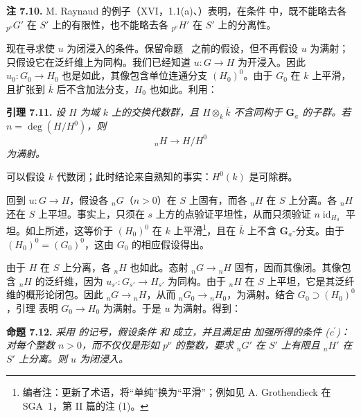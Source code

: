 \medskip
\noindent{}\textbf{注 7.10.}
M. Raynaud 的例子（XVI，1.1(a)、）表明，在条件  中，既不能略去各 \({}_{p^\nu}G'\) 在 \(S'\) 上的有限性，也不能略去各 \({}_{p^\nu}H'\) 在 \(S'\) 上的分离性。

现在寻求使 \(u\) 为闭浸入的条件。保留命题~ 之前的假设，但不再假设 \(u\) 为满射；只假设它在泛纤维上为同构。我们已经知道 \(u:G\to H\) 为开浸入。因此 \(u_0:G_0\to H_0\) 也是如此，其像包含单位连通分支 \((H_0)^0\)。由于 \(G_0\) 在 \(k\) 上平滑，且扩张到 \(\overline{k}\) 后不含加法分支，\(H_0\) 也如此。利用：

\medskip
\noindent{}\textbf{引理 7.11.}
\textit{设 \(H\) 为域 \(k\) 上的交换代数群，且 \(H\otimes_k\overline{k}\) 不含同构于 \(\mathbf G_a\) 的子群。若 \(n=\deg(H/H^0)\)，则}
\[
  {}_nH\longrightarrow H/H^0
\]
\textit{为满射。}

可以假设 \(k\) 代数闭；此时结论来自熟知的事实：\(H^0(k)\) 是可除群。

回到 \(u:G\to H\)，假设各 \({}_nG\)（\(n>0\)）在 \(S\) 上固有，而各 \({}_nH\) 在 \(S\) 上分离。各 \({}_nH\) 还在 \(S\) 上平坦。事实上，只须在 \(s\) 上方的点验证平坦性，从而只须验证 \(n\operatorname{id}_{H_0}\) 平坦。如上所述，这等价于 \((H_0)^0\) 在 \(k\) 上平滑\footnote{编者注：更新了术语，将“单纯”换为“平滑”；例如见 A. Grothendieck 在 SGA~1，第 II 篇的注 (1)。}，且在 \(\overline{k}\) 上不含 \(\mathbf G_a\)-分支。由于 \((H_0)^0=(G_0)^0\)，这由 \(G_0\) 的相应假设得出。

由于 \(H\) 在 \(S\) 上分离，各 \({}_nH\) 也如此。态射 \({}_nG\to{}_nH\) 固有，因而其像闭。其像包含 \({}_nH\) 的泛纤维，因为 \(u_{s'}:G_{s'}\to H_{s'}\) 为同构。由于 \({}_nH\) 在 \(S\) 上平坦，它是其泛纤维的概形论闭包。因此 \({}_nG\to{}_nH\)，从而 \({}_nG_0\to{}_nH_0\)，为满射。结合 \(G_0\supset(H_0)^0\)，引理  表明 \(G_0\to H_0\) 为满射。于是 \(u\) 为满射。得到：

\medskip
\noindent{}\textbf{命题 7.12.}
\textit{采用  的记号，假设条件  和  成立，并且满足由  加强所得的条件 (c\(^{\prime}\))：对每个整数 \(n>0\)，而不仅仅是形如 \(p^\nu\) 的整数，要求 \({}_nG'\) 在 \(S'\) 上有限且 \({}_nH'\) 在 \(S'\) 上分离。则 \(u\) 为闭浸入。}

